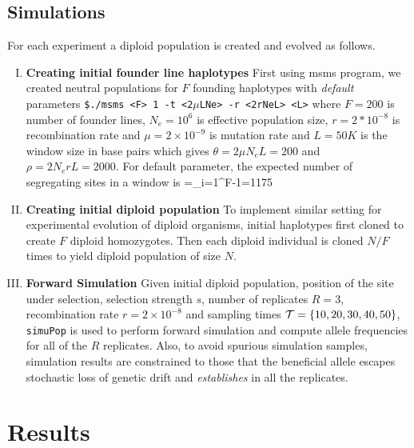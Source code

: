 \documentclass[11pt]{article}
\begin{document}
\subsection{Simulations}
For each experiment a diploid population is created and evolved as 
follows. 
\begin{enumerate}[I.]
	\item {\bf Creating initial founder line haplotypes}
	First using msms program, we created neutral populations for $F$ 
	founding 
	haplotypes with \emph{default} parameters \texttt{\$./msms <F> 1 
	-t 
		<2$\mu$LNe> 
		-r <2rNeL> 
		<L>} 
	where $F=200$ is number of founder lines, $N_e=10^6$ is 
	effective 
	population size, $r=2*10^{-8}$ is recombination rate and 
	$\mu=2\times 
	10^{-9}$ is mutation rate and  $L=50K$ is the window size in 
	base pairs 
	which gives $\theta=2\mu N_eL=200$ and $\rho=2N_erL=2000$. 
	For 
	default 
	parameter, the expected number of segregating sites in a window 
	is 
	\beqq
	\Ebb[M]=\theta \sum_{i=1}^{F-1}=1175
	\eeqq
	\item{\bf Creating initial diploid population} 
	To implement similar setting for experimental evolution of diploid 
	organisms, 
	initial  haplotypes first cloned to create $F$ diploid homozygotes. 
	Then 
	each 
	diploid individual is  cloned $N/F$ times to yield diploid 
	population of 
	size 
	$N$.
	\item{\bf Forward Simulation}
	Given initial diploid population, position of the site under 
	selection, 
	selection 
	strength $s$, number of replicates $R=3$, recombination rate 
	$r=2\times10^{-8}$ 
	and sampling times ${\cal T}=\{10,20,30,40,50\}$, \texttt{simuPop} is 
	used to 
	perform
	forward simulation and  compute allele frequencies for all of the 
	$R$ 
	replicates. Also, to avoid spurious simulation samples, simulation 
	results 
	are constrained to those that the beneficial allele escapes 
	stochastic loss 
	of genetic drift and \emph{establishes} in all the replicates. 
\end{enumerate}



\section{Results}
\end{document}
